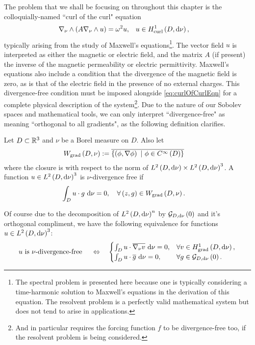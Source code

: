 The problem that we shall be focusing on throughout this chapter is the colloquially-named ``curl of the curl" equation 
\begin{align} \label{eq:curlOfCurlEqn}
	\nabla_{\nu}\wedge\left( A\nabla_{\nu}\wedge u \right) = \omega^2 u, &\quad u\in H^1_\mathrm{curl}\left( D, \mathrm{d}\nu \right),
\end{align}
typically arising from the study of Maxwell's equations\footnote{The spectral problem is presented here because one is typically considering a time-harmonic solution to Maxwell's equations in the derivation of this equation. The resolvent problem is a perfectly valid mathematical system but does not tend to arise in applications.}.
The vector field $u$ is interpreted as either the magnetic or electric field, and the matrix $A$ (if present) the inverse of the magnetic permeability or electric permittivity.
Maxwell's equations also include a condition that the divergence of the magnetic field is zero, as is that of the electric field in the presence of no external charges.
This divergence-free condition must be imposed alongside \eqref{eq:curlOfCurlEqn} for a complete physical description of the system\footnote{And in particular requires the forcing function $f$ to be divergence-free too, if the resolvent problem is being considered.}.
Due to the nature of our Sobolev spaces and mathematical tools, we can only interpret ``divergence-free" as meaning ``orthogonal to all gradients", as the following definition clarifies.
\begin{definition} \label{def:DivFreeGeneral}
	Let $D\subset\mathbb{R}^3$ and $\nu$ be a Borel measure on $D$.
	Also let
	\begin{align*}
		W_{\mathrm{grad}}\left( D,\nu \right) &:= \overline{\left\{  \left( \phi, \nabla\phi \right) \ \vert \ \phi\in C^{\infty}\left( D \right)  \right\}}
	\end{align*}
	where the closure is with respect to the norm of $L^{2}\left( D,\mathrm{d}\nu \right)\times L^{2}\left( D,\mathrm{d}\nu \right)^3$.
	A function $u\in L^{2}\left( D,\mathrm{d}\nu \right)^3$ is $\nu$-divergence free if
	\begin{align*}
		\int_{D} u\cdot g  \ \mathrm{d}\nu &= 0, \quad \forall \left( z,g \right)\in W_{\mathrm{grad}}\left( D,\nu \right).
	\end{align*}	 
\end{definition}
Of course due to the decomposition of $L^{2}\left( D,\mathrm{d}\nu \right)^n$ by $\mathcal{G}_{ D, \mathrm{d}\nu}\left( 0 \right)$ and it's orthogonal compliment, we have the following equivalence for functions $u\in L^{2}\left( D,\mathrm{d}\nu \right)^3$:
\begin{align*}
	u \text{ is } \nu\text{-divergence-free } \quad\Leftrightarrow\quad
	\begin{cases}
		\int_{D} u\cdot\overline{\nabla_{\nu}v}  \ \mathrm{d}\nu = 0, & \forall v\in H^1_\mathrm{grad}\left( D, \mathrm{d}\nu \right), \\
		\int_{D} u\cdot\overline{g}  \ \mathrm{d}\nu = 0, & \forall g\in\mathcal{G}_{ D, \mathrm{d}\nu}\left( 0 \right).
	\end{cases}
\end{align*}
